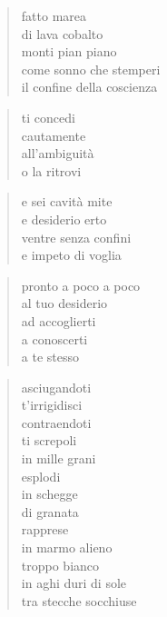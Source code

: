 \clearpage



	\begin{verse}
		fatto marea\\
		di lava cobalto\\
		monti pian piano\\
		come sonno che stemperi\\
		il confine della coscienza
	\end{verse}

	\begin{verse}
		ti concedi\\
		cautamente\\
		all’ambiguità\\
		o la ritrovi
	\end{verse}

	\begin{verse}
		e sei cavità mite\\
		e desiderio erto\\
		ventre senza confini\\
		e impeto di voglia
	\end{verse}

	\begin{verse}
		pronto a poco a poco\\
		al tuo desiderio\\
		ad accoglierti\\
		a conoscerti\\
		a te stesso
	\end{verse}


\clearpage



	\begin{verse}
		asciugandoti\\
		t’irrigidisci\\
		contraendoti\\
		ti screpoli\\
		in mille grani\\
		esplodi\\
		in schegge\\
		di granata\\
		rapprese\\
		in marmo alieno\\
		troppo bianco\\
		in aghi duri di sole\\
		tra stecche socchiuse
	\end{verse}

